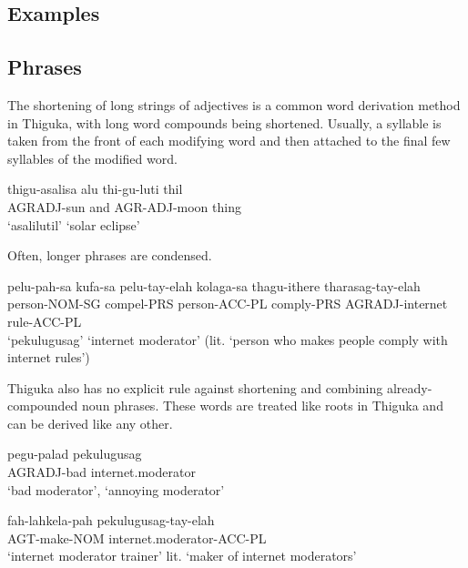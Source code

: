 \documentclass{article}
\newcommand{\textapprox}{\raisebox{0.5ex}{\texttildelow}}
\newcommand{\agradj}{AGR\textapprox{}ADJ}
\begin{document}
\begin{multicols}{2}
\section{Examples}
\subsection{Phrases}
The shortening of long strings of adjectives is a common word derivation method in Thiguka, with long word compounds being shortened.
Usually, a syllable is taken from the front of each modifying word and then attached to the final few syllables of the modified word.

\begin{exe}
    \ex{} \gll thi\textapprox{}gu-asalisa alu thi-gu-luti thil\\
                 AGR\textapprox{}ADJ-sun and AGR-ADJ-moon thing\\
                 `asalilutil'
    \glt{}       `solar eclipse'
\end{exe}

Often, longer phrases are condensed.

\begin{exe}
    \ex{} \gll pelu-pah-sa kufa-sa pelu-tay-elah kolaga-sa tha\textapprox{}gu-ithere tharasag-tay-elah\\
                 person-NOM-SG compel-PRS person-ACC-PL comply-PRS \agradj{}-internet rule-ACC-PL\\
                 `pekulugusag'
    \glt{}       `internet moderator'
    \glt{}       (lit. `person who makes people comply with internet rules')
\end{exe}

Thiguka also has no explicit rule against shortening and combining already-compounded noun phrases. These words are treated like roots in Thiguka and can be derived like any other.

\begin{exe}
    \ex{} \gll  pe\textapprox{}gu-palad pekulugusag\\
                \agradj{}-bad internet.moderator\\
    \glt{}      `bad moderator', `annoying moderator'
\end{exe}

\begin{exe}
    \ex{} \gll  fah-lahkela-pah pekulugusag-tay-elah\\
                AGT-make-NOM internet.moderator-ACC-PL\\
    \glt{}      `internet moderator trainer'
    \glt{}      lit. `maker of internet moderators'
\end{exe}


\end{multicols}
\end{document}
